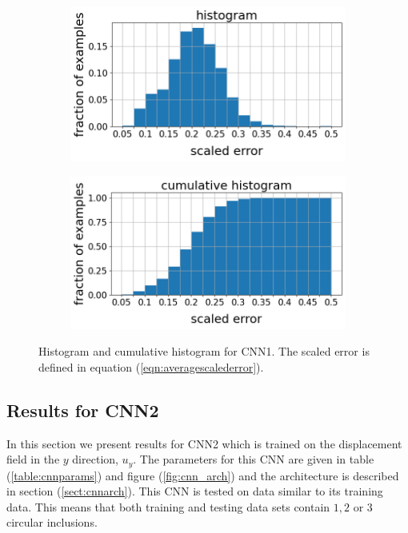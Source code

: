 \documentclass[12pt]{article}
\newcommand{\nhghistowidth}{0.48\linewidth}
\newcommand{\nhghistoheight}{4cm}
\begin{document}
\begin{figure}[!h]
\captionsetup[subfigure]{justification=centering}
  \centering
  \begin{subfigure}[c]{\nhghistowidth}
    \centering
    \includegraphics[totalheight=\nhghistoheight]{Figures/Results1New/histogram_new.png}
  \end{subfigure}
%  
  \begin{subfigure}[c]{\nhghistowidth}
    \centering
    \includegraphics[totalheight=\nhghistoheight]{Figures/Results1New/cumulative_new.png}
  \end{subfigure}
  \caption{\label{fig:cnn1histo} Histogram and cumulative histogram for CNN1. The scaled error is defined in equation (\ref{eqn:averagescalederror}).}
\end{figure}
%
\subsection{\label{sect:resultscnn2}Results for CNN2}
In this section we present results for CNN2 which is trained on the displacement field in the $y$ direction, $u_y$. The parameters for this CNN are given in table (\ref{table:cnnparams}) and figure (\ref{fig:cnn_arch}) and the architecture is described in section (\ref{sect:cnnarch}). This CNN is tested on data similar to its training data. This means that both training and testing data sets contain $1,2$ or $3$ circular inclusions.
\end{document}
